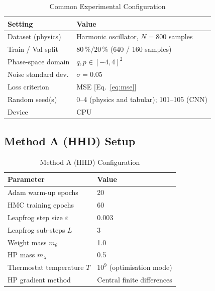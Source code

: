 \documentclass[11pt]{article}
\theoremstyle{definition}
\begin{document}
\begin{table}[H]
\centering
\caption{Common Experimental Configuration}
\label{tab:common_setup}
\renewcommand{\arraystretch}{1.2}
\begin{tabular}{ll}
\toprule
Setting & Value \\
\midrule
Dataset (physics)    & Harmonic oscillator, $N = 800$ samples \\
Train / Val split    & $80\,\% / 20\,\%$ (640 / 160 samples) \\
Phase-space domain   & $q, p \in [-4, 4]^2$ \\
Noise standard dev.  & $\sigma = 0.05$ \\
Loss criterion       & MSE [Eq.~\eqref{eq:mse}] \\
Random seed(s)       & 0--4 (physics and tabular); 101--105 (CNN) \\
Device               & CPU \\
\bottomrule
\end{tabular}
\end{table}

\subsection{Method A (HHD) Setup}
\begin{table}[H]
\centering
\caption{Method A (HHD) Configuration}
\label{tab:setup_a}
\renewcommand{\arraystretch}{1.2}
\begin{tabular}{ll}
\toprule
Parameter & Value \\
\midrule
Adam warm-up epochs             & 20 \\
HMC training epochs             & 60 \\
Leapfrog step size $\varepsilon$ & 0.003 \\
Leapfrog sub-steps $L$          & 3 \\
Weight mass $m_\theta$          & 1.0 \\
HP mass $m_\lambda$             & 0.5 \\
Thermostat temperature $T$      & $10^9$ (optimisation mode) \\
HP gradient method              & Central finite differences \\
\bottomrule
\end{tabular}
\end{table}
\end{document}
